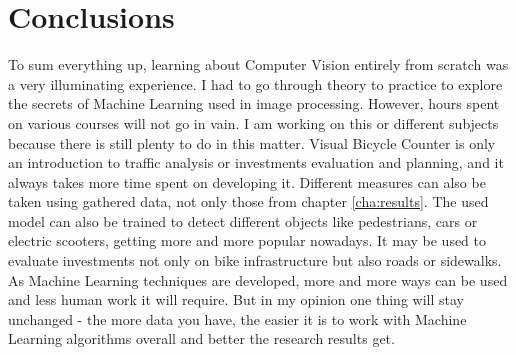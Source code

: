 \chapter{Conclusions}
\label{cha:conclusions}
To sum everything up, learning about Computer Vision entirely from scratch was a very illuminating experience. I had to go through theory to practice to explore the secrets of Machine Learning used in image processing. However, hours spent on various courses will not go in vain. I am working on this or different subjects because there is still plenty to do in this matter. Visual Bicycle Counter is only an introduction to traffic analysis or investments evaluation and planning, and it always takes more time spent on developing it. Different measures can also be taken using gathered data, not only those from chapter \ref{cha:results}. The used model can also be trained to detect different objects like pedestrians, cars or electric scooters, getting more and more popular nowadays. It may be used to evaluate investments not only on bike infrastructure but also roads or sidewalks. As Machine Learning techniques are developed, more and more ways can be used and less human work it will require. But in my opinion one thing will stay unchanged - the more data you have, the easier it is to work with Machine Learning algorithms overall and better the research results get.